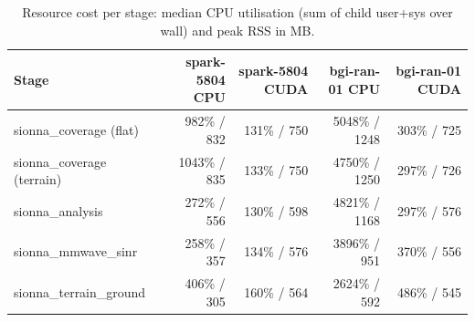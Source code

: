 \begin{table}[t]
  \centering
  \caption{Resource cost per stage: median CPU utilisation (sum of child user+sys over wall) and peak RSS in MB.}
  \label{tab:resources}
  \begin{tabular}{lrrrr}
    \toprule
    Stage & spark-5804 CPU & spark-5804 CUDA & bgi-ran-01 CPU & bgi-ran-01 CUDA \\
    \midrule
    sionna\_coverage (flat) & 982\% / 832 & 131\% / 750 & 5048\% / 1248 & 303\% / 725 \\
    sionna\_coverage (terrain) & 1043\% / 835 & 133\% / 750 & 4750\% / 1250 & 297\% / 726 \\
    sionna\_analysis & 272\% / 556 & 130\% / 598 & 4821\% / 1168 & 297\% / 576 \\
    sionna\_mmwave\_sinr & 258\% / 357 & 134\% / 576 & 3896\% / 951 & 370\% / 556 \\
    sionna\_terrain\_ground & 406\% / 305 & 160\% / 564 & 2624\% / 592 & 486\% / 545 \\
    \bottomrule
  \end{tabular}
\end{table}
